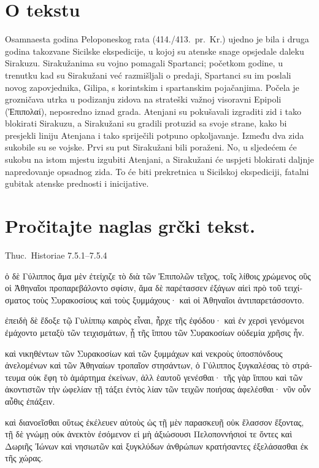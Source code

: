 


\section*{O tekstu}

Osamnaesta godina Peloponeskog rata (414./413.\ pr.~Kr.) ujedno je bila i druga godina takozvane Sicilske ekspedicije, u kojoj su atenske snage opsjedale daleku Sirakuzu. Sirakužanima su vojno pomagali Spartanci; početkom godine, u trenutku kad su Sirakužani već razmišljali o predaji, Spartanci su im poslali novog zapovjednika, Gilipa, s korintskim i spartanskim pojačanjima. Počela je grozničava utrka u podizanju zidova na strateški važnoj visoravni Epipoli \textgreek[variant=ancient]{(Ἐπιπολαί),} neposredno iznad grada. Atenjani su pokušavali izgraditi zid i tako blokirati Sirakuzu, a Sirakužani su gradili protuzid sa svoje strane, kako bi presjekli liniju Atenjana i tako spriječili potpuno opkoljavanje. Između dva zida sukobile su se vojske. Prvi su put Sirakužani bili poraženi. No, u sljedećem će sukobu na istom mjestu izgubiti Atenjani, a Sirakužani će uspjeti blokirati daljnje napredovanje opsadnog zida. To će biti prekretnica u Sicilskoj ekspediciji, fatalni gubitak atenske prednosti i inicijative.

\newpage

\section*{Pročitajte naglas grčki tekst.}

Thuc.\ Historiae 7.5.1–7.5.4


\medskip


{\large

\begin{greek}

\noindent ὁ δὲ Γύλιππος ἅμα μὲν ἐτείχιζε τὸ διὰ τῶν Ἐπιπολῶν τεῖχος, τοῖς λίθοις χρώμενος οὓς οἱ Ἀθηναῖοι προπαρεβάλοντο σφίσιν, ἅμα δὲ παρέτασσεν ἐξάγων αἰεὶ πρὸ τοῦ τειχίσματος τοὺς Συρακοσίους καὶ τοὺς ξυμμάχους· καὶ οἱ Ἀθηναῖοι ἀντιπαρετάσσοντο.

ἐπειδὴ δὲ ἔδοξε τῷ Γυλίππῳ καιρὸς εἶναι, ἦρχε τῆς ἐφόδου· καὶ ἐν χερσὶ γενόμενοι ἐμάχοντο μεταξὺ τῶν τειχισμάτων, ᾗ τῆς ἵππου τῶν Συρακοσίων οὐδεμία χρῆσις ἦν.

καὶ νικηθέντων τῶν Συρακοσίων καὶ τῶν ξυμμάχων καὶ νεκροὺς ὑποσπόνδους ἀνελομένων καὶ τῶν Ἀθηναίων τροπαῖον στησάντων, ὁ Γύλιππος ξυγκαλέσας τὸ στράτευμα οὐκ ἔφη τὸ ἁμάρτημα ἐκείνων, ἀλλ ἑαυτοῦ γενέσθαι· τῆς γὰρ ἵππου καὶ τῶν ἀκοντιστῶν τὴν ὠφελίαν τῇ τάξει ἐντὸς λίαν τῶν τειχῶν ποιήσας ἀφελέσθαι· νῦν οὖν αὖθις ἐπάξειν.

καὶ διανοεῖσθαι οὕτως ἐκέλευεν αὐτοὺς ὡς τῇ μὲν παρασκευῇ οὐκ ἔλασσον ἕξοντας, τῇ δὲ γνώμῃ οὐκ ἀνεκτὸν ἐσόμενον εἰ μὴ ἀξιώσουσι Πελοποννήσιοί τε ὄντες καὶ Δωριῆς Ἰώνων καὶ νησιωτῶν καὶ ξυγκλύδων ἀνθρώπων κρατήσαντες ἐξελάσασθαι ἐκ τῆς χώρας.

\end{greek}

}


